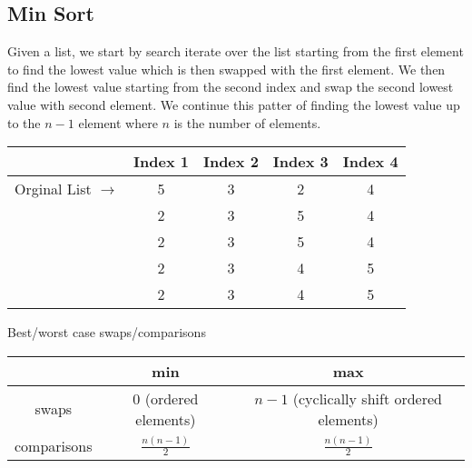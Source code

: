 \documentclass{article}
\begin{document}
\begin{spacing}{1.5}
\subsection{Min Sort}
\label{sec:minsort}
Given a list, we start by search iterate over the list starting from the first element to find the lowest value which is then swapped with the first element. We then find the lowest value starting from the second index and swap the second lowest value with second element. We continue this patter of finding the lowest value up to the $n-1$ element where $n$ is the number of elements.\\
\begin{tabular}{c c|c|c|c}
     & Index 1 & Index 2 & Index 3 & Index 4\\
         \hline
    Orginal List $\rightarrow$ & {\color{red}5} & {\color{red}3} & {\color{red}2} & {\color{red}4} \\
     & {\color{green}2} & {\color{red}3} & {\color{red}5} & {\color{red}4}\\
     & {\color{green}2} & {\color{green}3} & {\color{red}5} & {\color{red}4}\\
     & {\color{green}2} & {\color{green}3} & {\color{green}4} & {\color{red}5}\\
      & {\color{green}2} & {\color{green}3} & {\color{green}4} & {\color{green}5}\\
\end{tabular}
Best/worst case swaps/comparisons\\
\begin{tabular}{c|c|c}
     & min & max \\
     \hline
    swaps &  $0$ (ordered elements) & $n-1$ (cyclically shift ordered elements) \\
    comparisons & $\frac{n(n-1)}{2}$ &  $\frac{n(n-1)}{2}$
\end{tabular}

\end{spacing}
\end{document}

